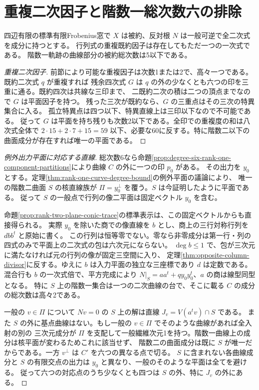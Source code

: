 \section{重複二次因子と階数一総次数六の排除}
\label{sec:rank-one-total-five}
\begin{theorem}\label{thm:rank-one-total-five}
四辺有限の標準有限Frobenius窓で $X$ は被約、反対根 $N$ は一般可逆で全二次式を成分に持つとする。
行列式の重複既約因子は存在してもただ一つの一次式である。
階数一軌跡の曲線部分の被約総次数は5以下である。
\end{theorem}
\begin{proof}[重複二次因子]
前節により可能な重複因子は次数1または2で、高々一つである。既約二次式 $q$ が重複すれば
残余四次式 $G$ は $q$ の外の少なくとも六つの印を三重に通る。既約四次は共線な三印まで、
二既約二次の積は二つの頂点までなので $G$ は平面因子を持つ。
残った三次が既約なら、$G$ の三重点はその三次の特異集合に入る。
孤立特異点は四つ以下、特異直線上は三印以下なので不可能である。
従って $G$ は平面を持ち残りも次数2以下である。全印での重複度の和は八次式全体で
$2\cdot15+2\cdot7+15=59$ 以下、必要な60に反する。特に階数二以下の曲面成分が存在すれば唯一の平面である。
\end{proof}
\begin{proof}[例外出力平面に対応する直線]
総次数6なら命題\ref{prop:degree-six-rank-one-component-partitions}により曲線 $C$ の外に一つの印 $p_0$ がある。
その出力を $y_0$ とする。定理\ref{thm:rank-one-curve-degree-bound}の例外平面の議論により、
唯一の階数二曲面 $S$ の核直線族が $\Pi=y_0^\perp$ を覆う。$S$ は今証明したように平面である。
従って $S$ の一般点で行列の像二平面は固定ベクトル $y_0$ を含む。

命題\ref{prop:rank-two-plane-conic-trace}の標準表示は、この固定ベクトルからも直接得られる。
実際 $y_0$ を除いた商での像直線を $b$ とし、商上の三行対称行列を $d b b^t$ と原始に書く。
この行列は恒等零でない。零なら非零成分は第一行・列の四式のみで平面上の二次式の包は六次元にならない。
$\deg b\le1$ で、包が三次元に満たなければ元の行列の像が固定三空間に入り、
定理\ref{thm:opposite-column-divisor}に反する。ゆえに $b$ は入力平面の独立な三座標であり $d$ は定数である。
混合行も $b$ の一次式倍で、平方完成により $N|_S=aa^t+q y_0 y_0^t$、$a$ の商は線型同型となる。
特に $S$ 上の階数一集合は一つの二次曲線の台で、そこに載る $C$ の成分の総次数は高々2である。

一般の $v\in\Pi$ について $Nv=0$ の $S$ 上の解は直線 $J_v=V(a^t v)\cap S$ である。
また $S$ の外に基点曲線はない。もし一般の $v\in\Pi$ でそのような曲線があれば全入射の別の
三次元成分が $\Pi$ を支配して一般繊維次元1を持つ。階数一曲線上の成分は核平面が変わるためこれに該当せず、
階数二の曲面成分は既に $S$ が唯一だからである。一方 $v^\perp$ は $C'$ を六つの異なる点で切る。
$S$ に含まれない各曲線成分と $S$ の有限交点の出力は $y_0$ と異なり、一般のそのような平面は全てを避ける。
従って六つの対応点のうち少なくとも四つは $S$ の外、特に $J_v$ の外にある。
\end{proof}

